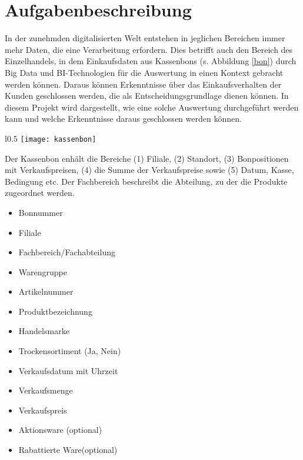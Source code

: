 \section{Aufgabenbeschreibung}

In der zunehmden digitalisierten Welt entstehen in jeglichen Bereichen immer mehr Daten, die eine Verarbeitung erfordern. Dies betrifft auch den Bereich des Einzelhandels, in dem Einkaufsdaten aus Kassenbons (s. Abbildung \ref{bon}) durch Big Data und BI-Technologien für die Auswertung in einen Kontext gebracht werden können. Daraus können Erkenntnisse über das Einkaufsverhalten der Kunden geschlossen werden, die als Entscheidungsgrundlage dienen können. In diesem Projekt wird dargestellt, wie eine solche Auswertung durchgeführt werden kann und welche Erkenntnisse daraus geschlossen werden können.

\begin{wrapfigure}[20]{l}{0.5\textwidth} %
  \centering
  \texttt{[image: kassenbon]}
  \caption{Kassenbon (Quelle: DBIS-Aufgaben)}
  \label{bon}
\end{wrapfigure}

\noindent Der Kassenbon enhält die Bereiche (1) Filiale, (2) Standort, (3) Bonpositionen mit Verkaufspreisen, (4) die Summe der Verkaufspreise sowie (5) Datum, Kasse, Bedingung etc.
Der Fachbereich beschreibt die Abteilung, zu der die Produkte zugeordnet werden.

\begin{itemize}
  \itemsep0em
  \item Bonnummer
  \item Filiale
  \item Fachbereich/Fachabteilung
  \item Warengruppe
  \item Artikelnummer
  \item Produktbezeichnung
  \item Handelsmarke
  \item Trockensortiment (Ja, Nein)
  \item Verkaufsdatum mit Uhrzeit
  \item Verkaufsmenge
  \item Verkaufspreis
  \item Aktionsware (optional)
  \item Rabattierte Ware(optional)
\end{itemize}

\newpage




